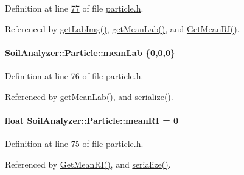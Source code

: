 Definition at line \hyperlink{particle_8h_source_l00077}{77} of file \hyperlink{particle_8h_source}{particle.\+h}.



Referenced by \hyperlink{particle_8cpp_source_l00138}{get\+Lab\+Img()}, \hyperlink{particle_8cpp_source_l00096}{get\+Mean\+Lab()}, and \hyperlink{particle_8cpp_source_l00120}{Get\+Mean\+R\+I()}.

\hypertarget{class_soil_analyzer_1_1_particle_a29dfce4053a62ae088e7220dea1954d9}{}
\paragraph[{mean\+Lab}]{ Soil\+Analyzer\+::\+Particle\+::mean\+Lab \{0,0,0\}\hspace{0.3cm}{\ttfamily [private]}}\label{class_soil_analyzer_1_1_particle_a29dfce4053a62ae088e7220dea1954d9}


Definition at line \hyperlink{particle_8h_source_l00076}{76} of file \hyperlink{particle_8h_source}{particle.\+h}.



Referenced by \hyperlink{particle_8cpp_source_l00096}{get\+Mean\+Lab()}, and \hyperlink{particle_8h_source_l00083}{serialize()}.

\hypertarget{class_soil_analyzer_1_1_particle_a872cff805a22cab5a04b76c58f9f1584}{}
\paragraph[{mean\+R\+I}]{\setlength{\rightskip}{0pt plus 5cm}float Soil\+Analyzer\+::\+Particle\+::mean\+R\+I = 0\hspace{0.3cm}{\ttfamily [private]}}\label{class_soil_analyzer_1_1_particle_a872cff805a22cab5a04b76c58f9f1584}


Definition at line \hyperlink{particle_8h_source_l00075}{75} of file \hyperlink{particle_8h_source}{particle.\+h}.



Referenced by \hyperlink{particle_8cpp_source_l00120}{Get\+Mean\+R\+I()}, and \hyperlink{particle_8h_source_l00083}{serialize()}.

